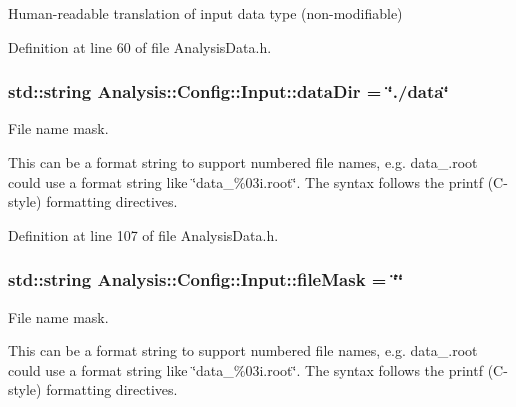 Human-\/readable translation of input data type (non-\/modifiable) 



Definition at line 60 of file Analysis\+Data.\+h.

\subsubsection[{\texorpdfstring{data\+Dir}{dataDir}}]{\setlength{\rightskip}{0pt plus 5cm}std\+::string Analysis\+::\+Config\+::\+Input\+::data\+Dir = \char`\"{}./data\char`\"{}\hspace{0.3cm}{\ttfamily [static]}}\hypertarget{namespaceAnalysis_1_1Config_1_1Input_a73db141eb393d7a7835899cf5e857b2d}{}\label{namespaceAnalysis_1_1Config_1_1Input_a73db141eb393d7a7835899cf5e857b2d}


File name mask. 

This can be a format string to support numbered file names, e.\+g. {\ttfamily data\+\_.\+root} could use a format string like {\ttfamily \char`\"{}data\+\_\+\%03i.\+root\char`\"{}}. The syntax follows the {\ttfamily printf} (C-\/style) formatting directives. 

Definition at line 107 of file Analysis\+Data.\+h.

\subsubsection[{\texorpdfstring{file\+Mask}{fileMask}}]{\setlength{\rightskip}{0pt plus 5cm}std\+::string Analysis\+::\+Config\+::\+Input\+::file\+Mask = \char`\"{}\char`\"{}\hspace{0.3cm}{\ttfamily [static]}}\hypertarget{namespaceAnalysis_1_1Config_1_1Input_a899bf3cd0603807b96f93b2ff5e58311}{}\label{namespaceAnalysis_1_1Config_1_1Input_a899bf3cd0603807b96f93b2ff5e58311}


File name mask. 

This can be a format string to support numbered file names, e.\+g. {\ttfamily data\+\_.\+root} could use a format string like {\ttfamily \char`\"{}data\+\_\+\%03i.\+root\char`\"{}}. The syntax follows the {\ttfamily printf} (C-\/style) formatting directives. 

